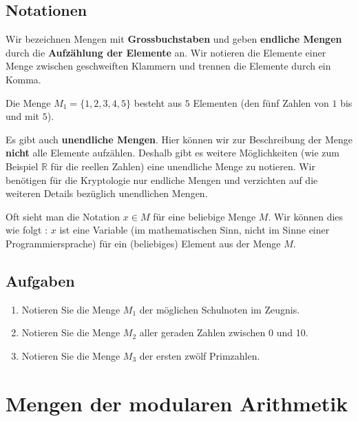 \subsection{Notationen}

Wir bezeichnen Mengen mit \textbf{Grossbuchstaben} und geben \textbf{endliche Mengen} durch die \textbf{Aufzählung der Elemente} an. Wir notieren die Elemente einer Menge zwischen geschweiften Klammern und trennen die Elemente durch ein Komma.

\begin{example}
Die Menge $M_1 = \{1, 2, 3, 4, 5\}$ besteht aus $5$ Elementen (den fünf Zahlen von $1$ bis und mit $5$).
\end{example}

Es gibt auch \textbf{unendliche Mengen}. Hier können wir zur Beschreibung der Menge \textbf{nicht} alle Elemente aufzählen. Deshalb gibt es weitere Möglichkeiten (wie zum Beispiel $\mathbb{R}$ für die reellen Zahlen) eine unendliche Menge zu notieren. Wir benötigen für die Kryptologie nur endliche Mengen und verzichten auf die weiteren Details bezüglich unendlichen Mengen.

\begin{important}
	Oft sieht man die Notation $x \in M$ für eine beliebige Menge $M$. Wir können dies wie folgt : $x$ ist eine Variable (im mathematischen Sinn, nicht im Sinne einer Programmiersprache) für ein (beliebiges) Element aus der Menge $M$.
\end{important}

\subsection{Aufgaben}

\begin{enumerate}
\item Notieren Sie die Menge $M_1$ der möglichen Schulnoten im Zeugnis.
\fillwithgrid{0.25in}
\item Notieren Sie die Menge $M_2$ aller geraden Zahlen zwischen \num{0} und \num{10}.
\fillwithgrid{0.25in}
\item Notieren Sie die Menge $M_3$ der ersten zwölf Primzahlen.
\fillwithgrid{0.25in}
\end{enumerate}

\section{Mengen der modularen Arithmetik}

